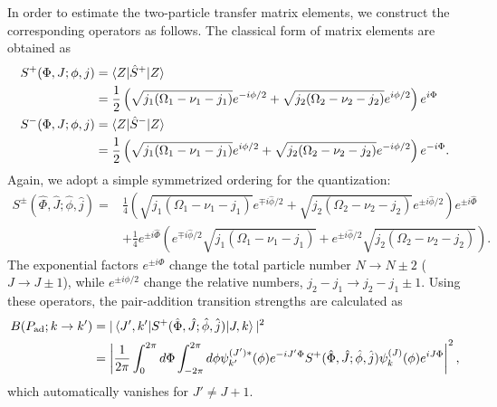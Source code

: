 \documentclass[11pt]{book} %
\begin{document}
In order to estimate the two-particle transfer matrix elements,
we construct the corresponding operators as follows.
The classical form of matrix elements are obtained as
\begin{align}
  S^+(\Phi,J;\phi,j) &= \braket{Z|\hat{S}^+|Z} \nonumber \\
 &= \frac{1}{2}
\left( \sqrt{j_1(\Omega_1-\nu_1-j_1)}e^{-i\phi/2}+\sqrt{j_2(\Omega_2-\nu_2-j_2)}e^{i\phi/2} \right) e^{i\Phi}
	\label{Sp_mean_value} \\
  S^-(\Phi,J;\phi,j) &= \braket{Z|\hat{S}^-|Z} \nonumber \\
 &= \frac{1}{2}
\left( \sqrt{j_1(\Omega_1-\nu_1-j_1)}e^{i\phi/2}+\sqrt{j_2(\Omega_2-\nu_2-j_2)}e^{-i\phi/2} \right) e^{-i\Phi} .
	\label{Sm_mean_value}
\end{align}
Again, we adopt a simple symmetrized ordering for the quantization:
\begin{align}
  S^\pm (\hat{\Phi},\hat{J};\hat{\phi},\hat{j})
	=& \frac{1}{4}\left( \sqrt{j_1(\Omega_1-\nu_1-j_1)}e^{\mp i\hat{\phi}/2}
+\sqrt{j_2(\Omega_2-\nu_2-j_2)}e^{\pm i\hat{\phi}/2} \right) e^{\pm i\hat{\Phi}} \nonumber \\ 
&+ \frac{1}{4}e^{\pm i\hat{\Phi}}\left( 
e^{\mp i\hat{\phi}/2}\sqrt{j_1(\Omega_1-\nu_1-j_1)}
+e^{\pm i\hat{\phi}/2}\sqrt{j_2(\Omega_2-\nu_2-j_2)} \right) .
\end{align}
The exponential factors $e^{\pm i\Phi}$ change
the total particle number $N\rightarrow N\pm 2$ ($J\rightarrow J\pm 1$),
while $e^{\pm i\phi/2}$ change the relative numbers,
$j_2-j_1 \rightarrow j_2-j_1 \pm 1$.
Using these operators,
the pair-addition transition strengths are calculated as
\begin{align}
B(P_{\rm ad};k\rightarrow k') &=
|\braket{J',k'|S^+(\hat{\Phi},\hat{J};\hat{\phi},\hat{j})|J,k}|^2
	\nonumber \\
&= \left| \frac{1}{2\pi} \int_{0}^{2\pi}d\Phi \int_{-2\pi}^{2\pi}d\phi 
	\psi^{(J')*}_{k'}(\phi) e^{-iJ'\Phi}
	S^+(\hat{\Phi},\hat{J};\hat{\phi},\hat{j})
	\psi^{(J)}_{k}(\phi)e^{iJ\Phi} \right|^2,
\end{align}
which automatically vanishes for $J'\neq J+1$.
\end{document}
